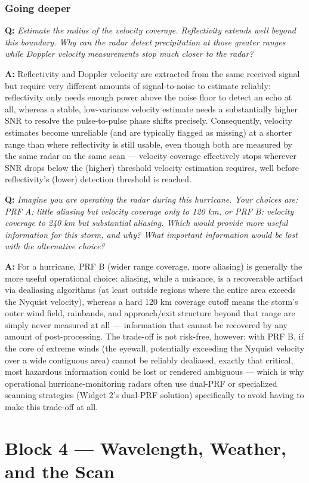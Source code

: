 \documentclass[11pt]{article}
\newenvironment{qa}[1]{\par\noindent\textbf{\color{qgray}Q: }\emph{#1}\par\noindent\textbf{A: }}{\par\vspace{6pt}}
\newcommand{\tier}[1]{\subsubsection*{#1}}
\begin{document}
\tier{Going deeper}
\begin{qa}{Estimate the radius of the velocity coverage. Reflectivity extends well beyond this boundary. Why can the radar detect precipitation at those greater ranges while Doppler velocity measurements stop much closer to the radar?}
Reflectivity and Doppler velocity are extracted from the same received signal but require very different amounts of signal-to-noise to estimate reliably: reflectivity only needs enough power above the noise floor to detect an echo at all, whereas a stable, low-variance velocity estimate needs a substantially higher SNR to resolve the pulse-to-pulse phase shifts precisely. Consequently, velocity estimates become unreliable (and are typically flagged as missing) at a shorter range than where reflectivity is still usable, even though both are measured by the same radar on the same scan --- velocity coverage effectively stops wherever SNR drops below the (higher) threshold velocity estimation requires, well before reflectivity's (lower) detection threshold is reached.
\end{qa}
\begin{qa}{Imagine you are operating the radar during this hurricane. Your choices are: PRF A: little aliasing but velocity coverage only to 120 km, or PRF B: velocity coverage to 240 km but substantial aliasing. Which would provide more useful information for this storm, and why? What important information would be lost with the alternative choice?}
For a hurricane, PRF B (wider range coverage, more aliasing) is generally the more useful operational choice: aliasing, while a nuisance, is a recoverable artifact via dealiasing algorithms (at least outside regions where the entire area exceeds the Nyquist velocity), whereas a hard 120 km coverage cutoff means the storm's outer wind field, rainbands, and approach/exit structure beyond that range are simply never measured at all --- information that cannot be recovered by any amount of post-processing. The trade-off is not risk-free, however: with PRF B, if the core of extreme winds (the eyewall, potentially exceeding the Nyquist velocity over a wide contiguous area) cannot be reliably dealiased, exactly that critical, most hazardous information could be lost or rendered ambiguous --- which is why operational hurricane-monitoring radars often use dual-PRF or specialized scanning strategies (Widget 2's dual-PRF solution) specifically to avoid having to make this trade-off at all.
\end{qa}
\clearpage
\section{Block 4 --- Wavelength, Weather, and the Scan}
\end{document}
